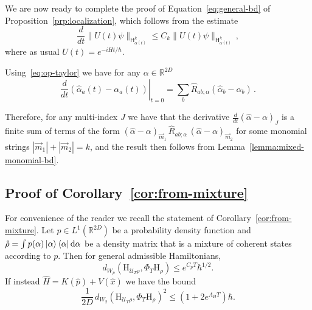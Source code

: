 \documentclass[11pt]{amsart}
\def\Husimi{{\mathrm{H}}}
\def\Sobolev{{\mathsf{H}}}
\def\Real{{\mathbb R}}
\newcommand{\diff}{\mathop{}\!\mathrm{d}}
\newcommand{\mcal}[1]{{\mathcal{#1}}}
\def\bra#1{\mathinner{\langle{#1}|}}
\def\ket#1{\mathinner{|{#1}\rangle}}
\numberwithin{equation}{section}
\newenvironment{customcor}[1]
  {\renewcommand\theinnercustomcor{#1}\innercustomcor}
  {\endinnercustomcor}
\begin{document}
We are now ready to complete the proof of Equation~\eqref{eq:general-bd} of Proposition~\ref{prp:localization},
which follows from the estimate
\begin{equation}
\label{eq:time-derivative}
\frac{d}{dt} \|U(t)\psi\|_{\Sobolev^k_{\alpha(t)}}
\leq C_k \|U(t)\psi\|_{\Sobolev^{k}_{\alpha(t)}}\,,
\end{equation}
where as usual $U(t) = e^{- i H t/\hbar}$.

Using~\eqref{eq:op-taylor} we have for any $\alpha\in\Real^{2D}$
\[
\left.\frac{d}{dt} (\hat{\alpha}_a(t) - \alpha_a(t))\right|_{t=0}
= \sum_b \hat{R}_{ab;\alpha} (\hat{\alpha}_b-\alpha_b)\,.
\]

Therefore, for any multi-index $J$ we have that the derivative $\frac{d}{dt}(\hat{\alpha}-\alpha)_J$ is a finite sum of
terms of the form $(\hat{\alpha}-\alpha)_{\vec{m}_1} \,\hat{R}_{ab;\alpha}\, (\hat{\alpha}-\alpha)_{\vec{m}_2}$ for some monomial
strings $|\vec{m}_1| + |\vec{m}_2| = k$, and the result then follows from Lemma~\ref{lemma:mixed-monomial-bd}.

\subsection{Proof of Corollary~\ref{cor:from-mixture}}
\label{sec:pffrommixture}
For convenience of the reader we recall the statement of Corollary~\ref{cor:from-mixture}.
\begin{customcor}{1.5}
\label{cor:from-mixture2}
Let $p\in L^1(\Real^{2D})$ be a probability density function and
$\hat{\rho} = \int p(\alpha) \ket{\alpha}\bra{\alpha}\diff\alpha$ be a density matrix that is a mixture of coherent states according to $p$.
Then for general admissible Hamiltonians,
\begin{equation}
d_{W_p}(\Husimi_{\mcal{U}_T\rho}, \Phi_T \Husimi_{\rho}) \leq e^{C_pT} \hbar^{1/2}.
\end{equation}
If instead $\hat{H}=K(\hat{p}) + V(\hat{x})$ we have the bound
\begin{equation}
\frac{1}{2D}\,d_{W_2}(\Husimi_{\mcal{U}_T\rho}, \Phi_T \Husimi_{\rho})^2 \leq (1 + 2 e^{\Lambda_HT}) \hbar.
\end{equation}
\end{customcor}
\end{document}

